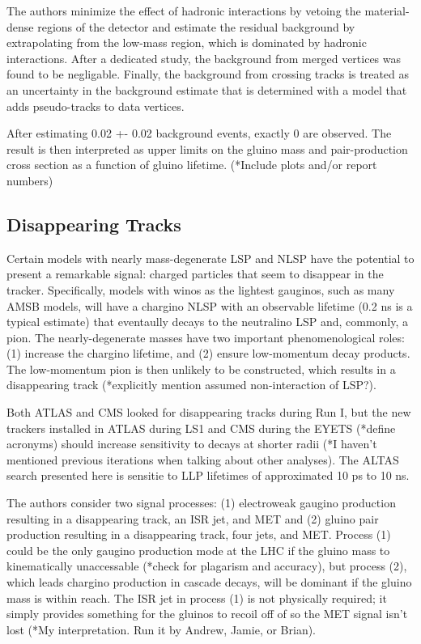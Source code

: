 \documentclass[12pt]{article}
\begin{document}
            The authors minimize the effect of hadronic interactions by vetoing the material-dense regions of the detector and estimate the residual background by extrapolating from the low-mass region, which is dominated by hadronic interactions. After a dedicated study, the background from merged vertices was found to be negligable. Finally, the background from crossing tracks is treated as an uncertainty in the background estimate that is determined with a model that adds pseudo-tracks to data vertices. 

            After estimating 0.02 +- 0.02 background events, exactly 0 are observed. The result is then interpreted as upper limits on the gluino mass and pair-production cross section as a function of gluino lifetime. (*Include plots and/or report numbers)

\subsection{Disappearing Tracks}
            Certain models with nearly mass-degenerate LSP and NLSP have the potential to present a remarkable signal: charged particles that seem to disappear in the tracker. Specifically, models with winos as the lightest gauginos, such as many AMSB models, will have a chargino NLSP with an observable lifetime (0.2 ns is a typical estimate) that eventaully decays to the neutralino LSP and, commonly, a pion. The nearly-degenerate masses have two important phenomenological roles: (1) increase the chargino lifetime, and (2) ensure low-momentum decay products. The low-momentum pion is then unlikely to be constructed, which results in a disappearing track (*explicitly mention assumed non-interaction of LSP?).

            Both ATLAS and CMS looked for disappearing tracks during Run I, but the new trackers installed in ATLAS during LS1 and CMS during the EYETS (*define acronyms) should increase sensitivity to decays at shorter radii (*I haven't mentioned previous iterations when talking about other analyses). The ALTAS search presented here is sensitie to LLP lifetimes of approximated 10 ps to 10 ns.

            The authors consider two signal processes: (1) electroweak gaugino production resulting in a disappearing track, an ISR jet, and MET and (2) gluino pair production resulting in a disappearing track, four jets, and MET. Process (1) could be the only gaugino production mode at the LHC if the gluino mass to kinematically unaccessable (*check for plagarism and accuracy), but process (2), which leads chargino production in cascade decays,  will be dominant if the gluino mass is within reach. The ISR jet in process (1) is not physically required; it simply provides something for the gluinos to recoil off of so the MET signal isn't lost (*My interpretation. Run it by Andrew, Jamie, or Brian).
\end{document}
